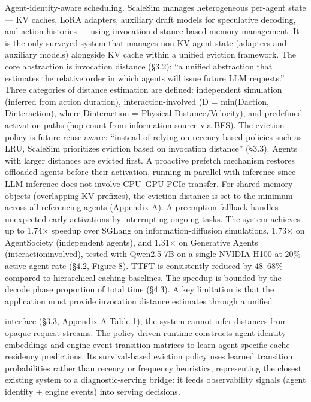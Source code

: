 \documentclass[preprint,12pt]{elsarticle}
\begin{document}
Agent-identity-aware scheduling. ScaleSim \cite{v5ref28} manages heterogeneous per-agent state --- KV caches, LoRA adapters, auxiliary draft models for speculative decoding, and action histories --- using invocation-distance-based memory management. It is the only surveyed system that manages non-KV agent state (adapters and auxiliary models) alongside KV cache within a unified eviction framework. The core abstraction is invocation distance (\S{}3.2): ``a unified abstraction that estimates the relative order in which agents will issue future LLM requests.'' Three categories of distance estimation are defined: independent simulation (inferred from action duration), interaction-involved (D = min(Daction, Dinteraction), where Dinteraction = Physical Distance/Velocity), and predefined activation paths (hop count from information source via BFS). The eviction policy is future reuse-aware: ``instead of relying on recency-based policies such as LRU, ScaleSim prioritizes eviction based on invocation distance'' (\S{}3.3). Agents with larger distances are evicted first. A proactive prefetch mechanism restores offloaded agents before their activation, running in parallel with inference since LLM inference does not involve CPU--GPU PCIe transfer. For shared memory objects (overlapping KV prefixes), the eviction distance is set to the minimum across all referencing agents (Appendix A). A preemption fallback handles unexpected early activations by interrupting ongoing tasks. The system achieves up to 1.74$\times$ speedup over SGLang on information-diffusion simulations, 1.73$\times$ on AgentSociety (independent agents), and 1.31$\times$ on Generative Agents (interactioninvolved), tested with Qwen2.5-7B on a single NVIDIA H100 at 20\% active agent rate (\S{}4.2, Figure 8). TTFT is consistently reduced by 48--68\% compared to hierarchical caching baselines. The speedup is bounded by the decode phase proportion of total time (\S{}4.3). A key limitation is that the application must provide invocation distance estimates through a unified


interface (\S{}3.3, Appendix A Table 1); the system cannot infer distances from opaque request streams. The policy-driven runtime \cite{v5ref47} constructs agent-identity embeddings and engine-event transition matrices to learn agent-specific cache residency predictions. Its survival-based eviction policy uses learned transition probabilities rather than recency or frequency heuristics, representing the closest existing system to a diagnostic-serving bridge: it feeds observability signals (agent identity + engine events) into serving decisions.
\end{document}
